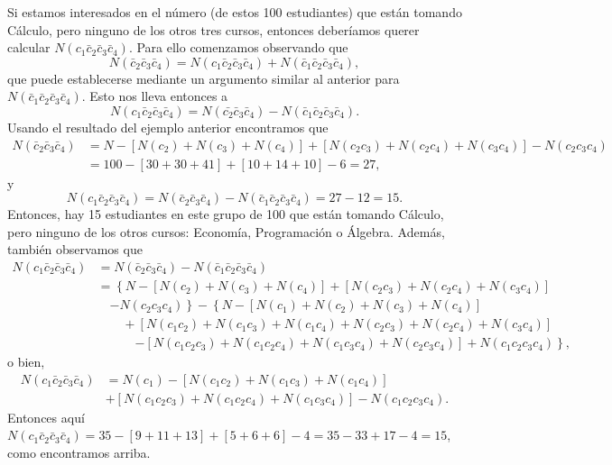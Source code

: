 \begin{myexample}
    Si estamos interesados en el número (de estos 100 estudiantes) que están tomando Cálculo, pero ninguno de los otros tres cursos, entonces deberíamos querer calcular $N\left(c_1 \bar{c}_2 \bar{c} _3 \bar{c}_4\right)$. Para ello comenzamos observando que
    $$N(\bar{c}_2 \bar{c}_3 \bar{c}_4) = N(c_1 \bar{c}_2 \bar{c}_3 \bar{c}_4)+N(\bar{c}_1 \bar{c}_2 \bar{c}_3 \bar{c}_4),$$
    que puede establecerse mediante un argumento similar al anterior para $N\left(\bar{c}_1 \bar{c}_2 \bar{c}_3 \bar{c}_4\right)$. Esto nos lleva entonces a
    $$N\left(c_1 \bar{c}_2 \bar{c}_3 \bar{c}_4\right)=N\left(\bar{c_2} \bar{c}_3 \bar{c}_4\right)-N\left(\bar{c}_1 \bar{c}_2 \bar{c}_3 \bar{c}_4\right).$$
    Usando el resultado del ejemplo anterior encontramos que
    \begin{align*}
        N\left(\bar{c}_2 \bar{c}_3 \bar{c}_4\right) & = N-\left[N\left(c_2\right)+N\left(c_3\right)+ N\left(c_4\right)\right]+\left[N\left(c_2 c_3\right)+N\left(c_2 c_4\right)+N\left(c_3 c_4\right)\right] - N\left(c_2 c_3 c_4\right) \\
        &= 100-[30+30+41]+[10+14+10]-6=27,
    \end{align*}
    y
    $$N\left(c_1 \bar{c}_2 \bar{c}_3 \bar{c}_4\right)=N\left(\bar{c}_2 \bar{c}_3 \bar{c}_4 \right)-N\left(\bar{c}_1 \bar{c}_2 \bar{c}_3 \bar{c}_4\right)=27-12=15 .$$
    Entonces, hay 15 estudiantes en este grupo de 100 que están tomando Cálculo, pero ninguno de los otros cursos: Economía, Programación o Álgebra. Además, también observamos que
    \begin{align*}
        N\left(c_1 \bar{c}_2 \bar{c}_3 \bar{c}_4\right)& = N\left(\bar{c}_2 \bar{c}_3 \bar{c}_4\right)-N\left(\bar{c}_1 \bar{c}_2 \bar{c}_3 \bar{c}_4\right) \\
        & = \left\{N-\left[N\left(c_2\right)+N\left(c_3\right)+N\left(c_4\right)\right]+\left[N\left(c_2 c_3\right)+N\left(c_2 c_4\right)+N\left(c_3 c_4\right)\right]\right. \\
        & \quad \left.-N\left(c_2 c_3 c_4\right)\right\}-\left\{N-\left[N\left(c_1\right)+N\left(c_2\right)+N\left(c_3\right)+N\left(c_4\right)\right]\right. \\
        & \quad\quad +\left[N\left(c_1 c_2\right)+N\left(c_1 c_3\right)+N\left(c_1 c_4\right)+N\left(c_2 c_3\right)+N\left(c_2 c_4\right)+N\left(c_3 c_4\right)\right] \\
        & \quad\quad\quad \left.-\left[N\left(c_1 c_2 c_3\right)+N\left(c_1 c_2 c_4\right)+N\left(c_1 c_3 c_4\right)+N\left(c_2 c_3 c_4\right)\right]+N\left(c_1 c_2 c_3 c_4\right)\right\},
    \end{align*}
    o bien,
    \begin{align*}
        N\left(c_1 \bar{c}_2 \bar{c}_3 \bar{c}_4\right) & = N\left(c_1\right)-\left[N\left(c_1 c_2\right)+N\left(c_1 c_3\right)+N\left(c_1 c_4\right)\right] \\
        & +\left[N\left(c_1 c_2 c_3\right)+N\left(c_1 c_2 c_4\right)+N\left(c_1 c_3 c_4\right)\right]-N\left(c_1 c_2 c_3 c_4\right) .
    \end{align*}
    Entonces aquí $N\left(c_1 \bar{c}_2 \bar{c}_3 \bar{c}_4\right)=35-[9+11+13]+[5+6+6]-4= 35-33+17-4=15$, como encontramos arriba.
\end{myexample}


